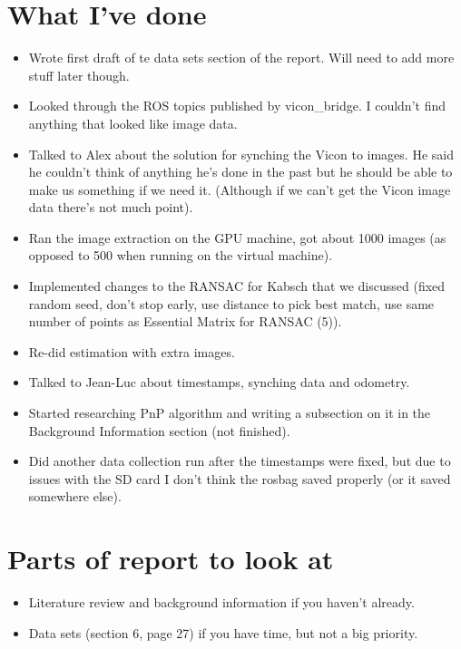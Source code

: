 \documentclass[12pt,a4paper]{article}
\begin{document}
\author{Katrina Ashton}


\pagestyle{fancy}
\fancyhf{}
\rhead{\thepage}

\section{What I've done}
\begin{itemize}
\item Wrote first draft of te data sets section of the report. Will need to add more stuff later though.
\item Looked through the ROS topics published by vicon\_bridge. I couldn't find anything that looked like image data.
\item Talked to Alex about the solution for synching the Vicon to images. He said he couldn't think of anything he's done in the past but he should be able to make us something if we need it. (Although if we can't get the Vicon image data there's not much point).
\item Ran the image extraction on the GPU machine, got about 1000 images (as opposed to 500 when running on the virtual machine).
\item Implemented changes to the RANSAC for Kabsch that we discussed (fixed random seed, don't stop early, use distance to pick best match, use same number of points as Essential Matrix for RANSAC (5)). 
\item Re-did estimation with extra images.
\item Talked to Jean-Luc about timestamps, synching data and odometry.
\item Started researching PnP algorithm and writing a subsection on it in the Background Information section (not finished). 
\item Did another data collection run after the timestamps were fixed, but due to issues with the SD card I don't think the rosbag saved properly (or it saved somewhere else). 
\end{itemize}

\section{Parts of report to look at}
\begin{itemize}
\item Literature review and background information if you haven't already.
\item Data sets (section 6, page 27) if you have time, but not a big priority.
\end{itemize}
\end{document}
